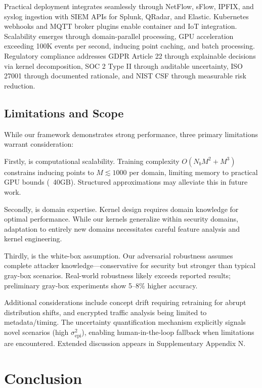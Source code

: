 \documentclass[review,12pt]{elsarticle}
\begin{document}
Practical deployment integrates seamlessly through NetFlow, sFlow, IPFIX, and syslog ingestion with SIEM APIs for Splunk, QRadar, and Elastic. Kubernetes webhooks and MQTT broker plugins enable container and IoT integration. Scalability emerges through domain-parallel processing, GPU acceleration exceeding 100K events per second, inducing point caching, and batch processing. Regulatory compliance addresses GDPR Article 22 through explainable decisions via kernel decomposition, SOC 2 Type II through auditable uncertainty, ISO 27001 through documented rationale, and NIST CSF through measurable risk reduction.

\subsection{Limitations and Scope}

While our framework demonstrates strong performance, three primary limitations warrant consideration:

Firstly, is computational scalability. Training complexity $O(N_bM^2 + M^3)$ constrains inducing points to $M \lesssim 1000$ per domain, limiting memory to practical GPU bounds (~40GB). Structured approximations may alleviate this in future work.

Secondly, is domain expertise. Kernel design requires domain knowledge for optimal performance. While our kernels generalize within security domains, adaptation to entirely new domains necessitates careful feature analysis and kernel engineering.

Thirdly, is the white-box assumption. Our adversarial robustness assumes complete attacker knowledge—conservative for security but stronger than typical gray-box scenarios. Real-world robustness likely exceeds reported results; preliminary gray-box experiments show 5--8\% higher accuracy.

Additional considerations include concept drift requiring retraining for abrupt distribution shifts, and encrypted traffic analysis being limited to metadata/timing. The uncertainty quantification mechanism explicitly signals novel scenarios (high $\sigma^2_{\text{epi}}$), enabling human-in-the-loop fallback when limitations are encountered. Extended discussion appears in Supplementary Appendix N.

\section{Conclusion}
\end{document}
